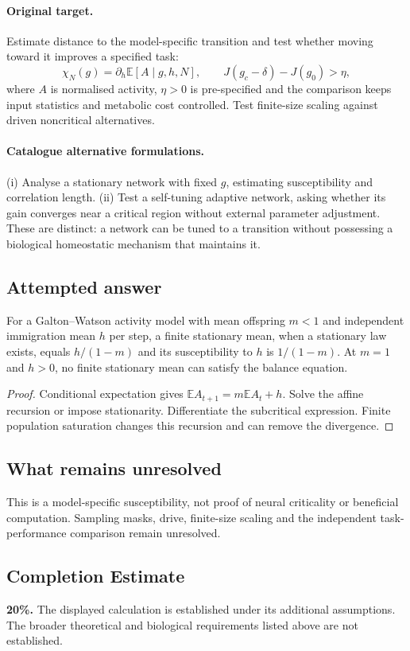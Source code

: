 \documentclass[11pt]{article}
\begin{document}
\paragraph{Original target.}
Estimate distance to the model-specific transition and test whether moving toward it improves a specified task:
\[
\chi_N(g)=\partial_h\mathbb{E}[A\mid g,h,N],\qquad
J(g_c-\delta)-J(g_0)>\eta,
\]
where $A$ is normalised activity, $\eta>0$ is pre-specified and the comparison keeps input statistics and metabolic cost controlled. Test finite-size scaling against driven noncritical alternatives.
\paragraph{Catalogue alternative formulations.}
(i) Analyse a stationary network with fixed $g$, estimating susceptibility and correlation length. (ii) Test a self-tuning adaptive network, asking whether its gain converges near a critical region without external parameter adjustment. These are distinct: a network can be tuned to a transition without possessing a biological homeostatic mechanism that maintains it.
\subsection{Attempted answer}
\begin{proposition}
For a Galton--Watson activity model with mean offspring $m<1$ and independent immigration mean $h$ per step, a finite stationary mean, when a stationary law exists, equals $h/(1-m)$ and its susceptibility to $h$ is $1/(1-m)$. At $m=1$ and $h>0$, no finite stationary mean can satisfy the balance equation.
\end{proposition}
\begin{proof}
Conditional expectation gives $\mathbb{E} A_{t+1}=m\mathbb{E} A_t+h$. Solve the affine recursion or impose stationarity. Differentiate the subcritical expression. Finite population saturation changes this recursion and can remove the divergence.
\end{proof}
\subsection{What remains unresolved}
This is a model-specific susceptibility, not proof of neural criticality or beneficial computation. Sampling masks, drive, finite-size scaling and the independent task-performance comparison remain unresolved.
\subsection{Completion Estimate}
\textbf{20\%.} The displayed calculation is established under its additional assumptions. The broader theoretical and biological requirements listed above are not established.
\end{document}
